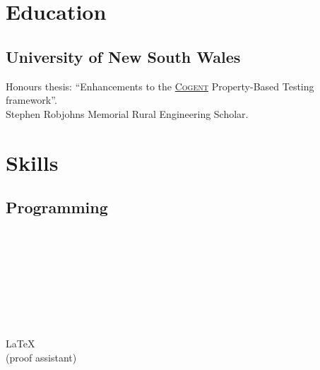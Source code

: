 \documentclass[a4paper]{resume}
\begin{document}
\lastupdated{}

\begin{minipage}[t]{0.33\textwidth} %
	\section{Education}
	\smallsectionspace{}

	\subsection{University of New South Wales}
	Honours thesis: ``Enhancements to the \href{https://github.com/NICTA/cogent}{\textsc{Cogent}} Property-Based
	Testing framework''. \\ Stephen Robjohns Memorial Rural Engineering Scholar.

	\section{Skills}
	\smallsectionspace{}

	\subsection{Programming}
	\smallsectionspace{}

	\rust{} \\
	\clang{} \textbullet{} \cpp{} \\
	\python{} \textbullet{} \bash{} \\
	\typescript{} \textbullet{} \javascript{} \\
	\smallsectionspace{}

	\java{} \textbullet{} \kotlin{} \\
	\haskell{} \\
	\vhdl{} \textbullet{} \verilog{} \\
	\LaTeX{} \textbullet{} \matlab{} \\
	\isabelle{} (proof assistant) \\
	\sectionspace{}


\end{minipage}
\end{document}
